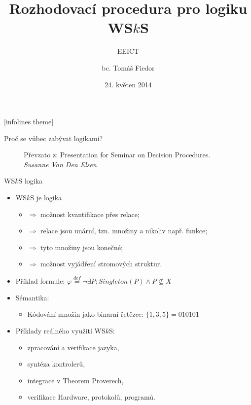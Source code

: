 \documentclass{beamer}
\title[Rozhodovací procedura pro logiku WS$k$S]{Rozhodovací procedura pro logiku
WS$k$S}
\subtitle{EEICT}
\author[T. Fiedor]{bc. Tomáš Fiedor}
\date{24. květen 2014}
\institute[vedoucí: Lengál]{pod vedením Ing. Ondřeje Lengála}
\begin{document}
[infolines theme]

  \begin{frame}[plain]
    \titlepage
  \end{frame}

  \begin{frame}{Proč se vůbec zabývat logikami?}
  \begin{figure}
  \begin{center}
   \caption{Převzato z: Presentation for Seminar on Decision Procedures.
   \emph{Susanne Van Den Elsen}}
   \end{center}
   \end{figure}
  \end{frame}	

	\begin{frame}{WS$k$S logika}
     \begin{itemize}
       \item WS$k$S je logika
       \begin{itemize}
         \pause
         \item {\color{blue}{druhého řádu}} $\Rightarrow$ možnost kvantifikace
         přes relace;
         \pause
         \item {\color{blue}{monadická}} $\Rightarrow$ relace jsou unární, tzn.
         množiny a nikoliv např. funkce;
         \pause
         \item {\color{blue}{slabá}} $\Rightarrow$ tyto množiny jsou konečné;
         \pause
         \item {\color{blue}{s $k$ následníky}} $\Rightarrow$ možnost vyjádření
         stromových struktur.
         \pause
       \end{itemize}
              \item Příklad formule: $\varphi \overset{\mathit{def}}{=}
    \neg\exists P:
    Singleton(P) \wedge P
    \not\subseteq X$
       \pause
       \item Sémantika:
        \begin{itemize}
          \item Kódování množin jako binarní řetězce: $\{1, 3, 5\} = 010101$
        \end{itemize}
        \pause
       \item Příklady reálného využití WS$k$S:
       \begin{itemize}
         \item zpracování a verifikace jazyka,
         \item syntéza kontrolerů,
         \item integrace v Theorem Proverech,
         \item verifikace Hardware, protokolů, programů.
       \end{itemize}
     \end{itemize}
	\end{frame}
  
\end{document}
